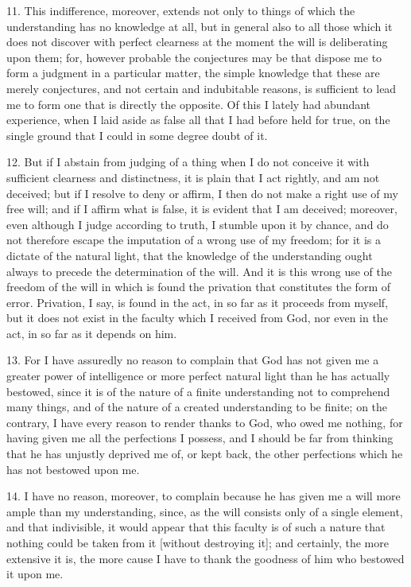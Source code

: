 11. This indifference, moreover, extends not only to things of which the understanding has no knowledge at all, but in general also to all those which it does not discover with perfect clearness at the moment the will is deliberating upon them; for, however probable the conjectures may be that dispose me to form a judgment in a particular matter, the simple knowledge that these are merely conjectures, and not certain and indubitable reasons, is sufficient to lead me to form one that is directly the opposite. Of this I lately had abundant experience, when I laid aside as false all that I had before held for true, on the single ground that I could in some degree doubt of it.

12. But if I abstain from judging of a thing when I do not conceive it with sufficient clearness and distinctness, it is plain that I act rightly, and am not deceived; but if I resolve to deny or affirm, I then do not make a right use of my free will; and if I affirm what is false, it is evident that I am deceived; moreover, even although I judge according to truth, I stumble upon it by chance, and do not therefore escape the imputation of a wrong use of my freedom; for it is a dictate of the natural light, that the knowledge of the understanding ought always to precede the determination of the will. And it is this wrong use of the freedom of the will in which is found the privation that constitutes the form of error. Privation, I say, is found in the act, in so far as it proceeds from myself, but it does not exist in the faculty which I received from God, nor even in the act, in so far as it depends on him.

13. For I have assuredly no reason to complain that God has not given me a greater power of intelligence or more perfect natural light than he has actually bestowed, since it is of the nature of a finite understanding not to comprehend many things, and of the nature of a created understanding to be finite; on the contrary, I have every reason to render thanks to God, who owed me nothing, for having given me all the perfections I possess, and I should be far from thinking that he has unjustly deprived me of, or kept back, the other perfections which he has not bestowed upon me.

14. I have no reason, moreover, to complain because he has given me a will more ample than my understanding, since, as the will consists only of a single element, and that indivisible, it would appear that this faculty is of such a nature that nothing could be taken from it [without destroying it]; and certainly, the more extensive it is, the more cause I have to thank the goodness of him who bestowed it upon me.

